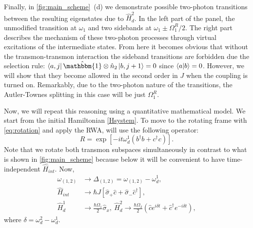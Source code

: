 \documentclass[%
 prx,
 amsmath,amssymb,
 reprint,%
]{revtex4-1}
\begin{document}
Finally, in \autoref{fig:main_scheme}~(d) we demonstrate possible two-photon transitions between the resulting eigenstates due to $\hat H_{d}^2$. In the left part of the panel, the unmodified transition at $\omega_1$ and two sidebands at $\omega_1 \pm \Omega_1^R/2$. The right part describes the mechanism of these two-photon processes through virtual excitations of the intermediate states. From here it becomes obvious that without the transmon-transmon interaction the sideband transitions are forbidden due the selection rule: $\bra{a,j}\hat{\mathbbm{1}}\otimes \hat n_2 \ket{b, j+1} = 0$ since $\braket{a}{b} = 0$. However, we will show that they become allowed in the second order in $J$ when the coupling is turned on.  Remarkably, due to the two-photon nature of the transitions, the Autler-Townes splitting in this case will be just $\Omega_1^R$.

Now, we will repeat this reasoning using a quantitative mathematical model. We start from the initial Hamiltonian \autoref{Hsystem}. To move to the rotating frame with \autoref{eq:rotation} and apply the RWA, will use the following operator:
\begin{equation}
R = \exp[-it \omega_d^1 (b^{\dagger}b+c^{\dagger}c)].
\end{equation}  
Note that we rotate both transmon subspaces simultaneously in contrast to what is shown in \autoref{fig:main_scheme} because below it will be convenient to have time-independent $\hat H_{int}$. Now,
\begin{equation}
\begin{aligned}
\omega_{(1,2)} &\rightarrow \Delta_{(1,2)} = \omega_{(1,2)} - \omega_d^{1},\\
\hat H_{int} &\rightarrow  \hbar J \left[\hat \sigma_+ \hat c + \hat \sigma_-\hat c^\dag \right],\\
\hat H_{d}^1 &\rightarrow \frac{\hbar \Omega_1}{2} \hat \sigma_x,\ 
\hat H_{d}^2 \rightarrow \frac{\hbar \Omega_2}{2}(\hat c e^{i\delta t}  + \hat c^\dag e^{-i\delta t}),
\end{aligned}
\end{equation}
where $\delta = \omega_{d}^2 - \omega_{d}^1$.
\end{document}
